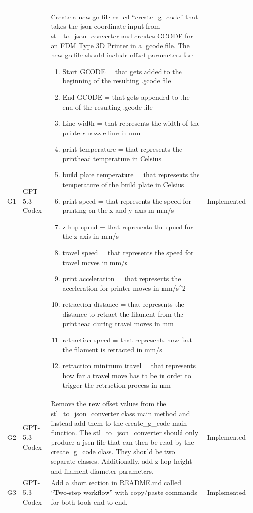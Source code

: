 \documentclass[10pt,twocolumn,a4paper]{article}
\begin{document}
\begin{longtable}{@{}p{0.6cm}p{1.5cm}p{11.0cm}p{2.7cm}@{}}
\midrule
G1 & GPT-5.3 Codex & Create a new go file called ``create\_g\_code'' that takes the json coordinate input from stl\_to\_json\_converter and creates GCODE for an FDM Type 3D Printer in a .gcode file. The new go file should include offset parameters for:
\begin{enumerate}
	\item{Start GCODE = that gets added to the beginning of the resulting .gcode file}
	\item{End GCODE = that gets appended to the end of the resulting .gcode file}
	\item{Line width = that represents the width of the printers nozzle line in mm}
	\item{print temperature = that represents the printhead temperature in Celsius}
	\item{build plate temperature = that represents the temperature of the build plate in Celsius}
	\item{print speed = that represents the speed for printing on the x and y axis in mm/s}
	\item{z hop speed = that represents the speed for the z axis in mm/s}
	\item{travel speed = that represents the speed for travel moves in mm/s}
	\item{print acceleration = that represents the acceleration for printer moves in mm/s\^{}2} \item{retraction distance = that represents the distance to retract the filament from the printhead during travel moves in mm}
	\item{retraction speed = that represents how fast the filament is retracted in mm/s}
	\item{retraction minimum travel = that represents how far a travel move has to be in order to trigger the retraction process in mm} 
\end{enumerate} & Implemented \\
\addlinespace
G2 & GPT-5.3 Codex & Remove the new offset values from the stl\_to\_json\_converter class main method and instead add them to the create\_g\_code main function. The stl\_to\_json\_converter should only produce a json file that can then be read by the create\_g\_code class. They should be two separate classes. Additionally, add z-hop-height and filament-diameter parameters. & Implemented \\
\addlinespace
G3 & GPT-5.3 Codex & Add a short section in README.md called ``Two-step workflow'' with copy/paste commands for both tools end-to-end. & Implemented \\

\end{longtable}
\end{document}
